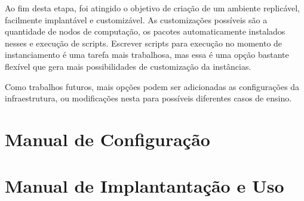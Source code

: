 \documentclass[tg]{mdtufsm}
\begin{document}
Ao fim desta etapa, foi atingido o objetivo de criação de um ambiente replicável, facilmente implantável e customizável. As customizações possíveis são a quantidade de nodos de computação, os pacotes automaticamente instalados nesses e execução de scripts. Escrever scripts para execução no momento de instanciamento é uma tarefa mais trabalhosa, mas essa é uma opção bastante flexível que gera mais possibilidades de customização da instâncias.

Como trabalhos futuros, mais opções podem ser adicionadas as configurações da infraestrutura, ou modificações nesta para possíveis diferentes casos de ensino.


\setlength{\baselineskip}{\baselineskip}



\appendix
\chapter{Manual de Configuração}
\label{appendix:setupManual}


\chapter{Manual de Implantantação e Uso}
\label{appendix:userManual}

\end{document}
